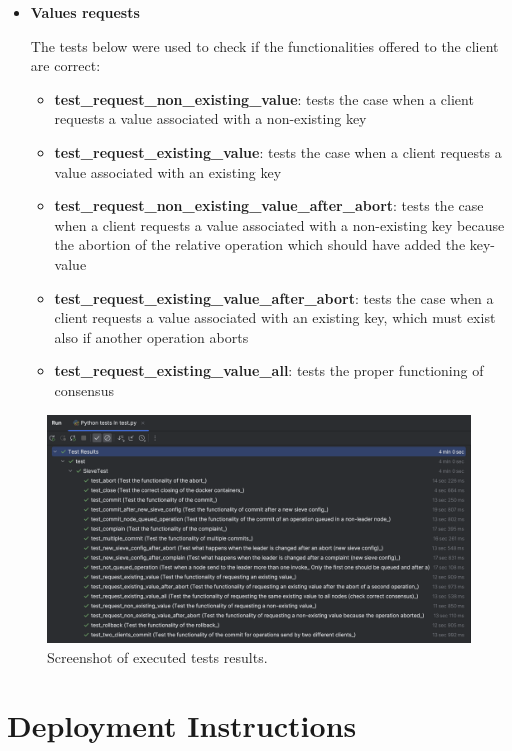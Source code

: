 \documentclass{scrartcl}
\begin{document}
\begin{itemize}
    \item \textbf{Values requests}
    
        The tests below were used to check if the functionalities offered to the client are correct:
        \begin{itemize}
            \item \textbf{test\_request\_non\_existing\_value}: tests the case when a client requests a value associated with a non-existing key
            \item \textbf{test\_request\_existing\_value}: tests the case when a client requests a value associated with an existing key
            \item \textbf{test\_request\_non\_existing\_value\_after\_abort}: tests the case when a client requests a value associated with a non-existing key because the abortion of the relative operation which should have added the key-value
            \item \textbf{test\_request\_existing\_value\_after\_abort}: tests the case when a client requests a value associated with an existing key, which must exist also if another operation aborts
            \item \textbf{test\_request\_existing\_value\_all}: tests the proper functioning of consensus
        \end{itemize}
    
\end{itemize}

\begin{figure}[H]
    \centering
    \includegraphics[width=.9\linewidth]{figures/tests.png}
    \caption{Screenshot of executed tests results.}
    \label{fig:tests} 
\end{figure}


\section{Deployment Instructions}
\end{document}
